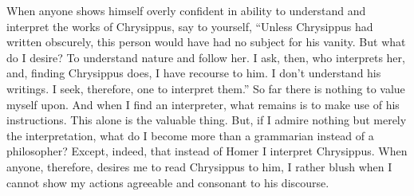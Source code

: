 When  anyone  shows himself  overly  confident  in  ability to  understand  and
interpret the  works of  Chrysippus, say to  yourself, ``Unless  Chrysippus had
written obscurely,  this person would have  had no subject for  his vanity. But
what  do I  desire? To  understand  nature and  follow  her. I  ask, then,  who
interprets her, and,  finding Chrysippus does, I have recourse  to him. I don't
understand his  writings. I seek,  therefore, one  to interpret them.''  So far
there is  nothing to value  myself upon. And when  I find an  interpreter, what
remains is to make  use of his instructions. This alone  is the valuable thing.
But, if I admire  nothing but merely the interpretation, what  do I become more
than a  grammarian instead of  a philosopher?  Except, indeed, that  instead of
Homer  I interpret  Chrysippus.  When  anyone, therefore,  desires  me to  read
Chrysippus to him, I  rather blush when I cannot show  my actions agreeable and
consonant to his discourse.
